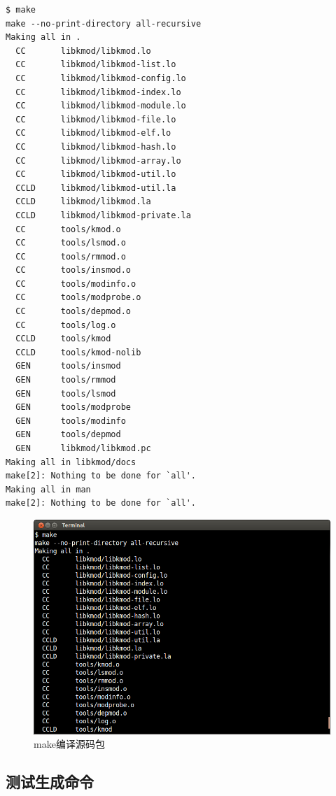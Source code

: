 {\begin{shaded}\begin{verbatim}
$ make
make --no-print-directory all-recursive
Making all in .
  CC       libkmod/libkmod.lo
  CC       libkmod/libkmod-list.lo
  CC       libkmod/libkmod-config.lo
  CC       libkmod/libkmod-index.lo
  CC       libkmod/libkmod-module.lo
  CC       libkmod/libkmod-file.lo
  CC       libkmod/libkmod-elf.lo
  CC       libkmod/libkmod-hash.lo
  CC       libkmod/libkmod-array.lo
  CC       libkmod/libkmod-util.lo
  CCLD     libkmod/libkmod-util.la
  CCLD     libkmod/libkmod.la
  CCLD     libkmod/libkmod-private.la
  CC       tools/kmod.o
  CC       tools/lsmod.o
  CC       tools/rmmod.o
  CC       tools/insmod.o
  CC       tools/modinfo.o
  CC       tools/modprobe.o
  CC       tools/depmod.o
  CC       tools/log.o
  CCLD     tools/kmod
  CCLD     tools/kmod-nolib
  GEN      tools/insmod
  GEN      tools/rmmod
  GEN      tools/lsmod
  GEN      tools/modprobe
  GEN      tools/modinfo
  GEN      tools/depmod
  GEN      libkmod/libkmod.pc
Making all in libkmod/docs
make[2]: Nothing to be done for `all'.
Making all in man
make[2]: Nothing to be done for `all'.
\end{verbatim}\end{shaded}}
\begin{figure}[htbp]
\centering
\includegraphics{./pictures/1-4-make.png}
\caption{make编译源码包}
\end{figure}

\subsection{测试生成命令}

